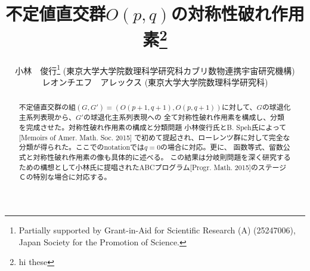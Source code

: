 \documentclass[12pt]{article} %
\theoremstyle{definition}
\theoremstyle{exampstyle} \newtheorem{examp}[theorem]{Theorem}
\newcommand{\doubt}[1]{\uwave{#1}}
\begin{document}
\renewcommand{\abstractname}{概要}

\title{不定値直交群$O(p,q)$の対称性破れ作用素\thanks{hi these}}

\author{小林　俊行\thanks{Partially supported by Grant-in-Aid for Scientific
Research (A) (25247006), Japan Society for the Promotion of Science.} (東京大学\;大学院数理科学研究科\doubt{・}カブリ数物連携宇宙研究機構)\\
  レオンチエフ　アレックス (東京大学\;大学院数理科学研究科)}




  \maketitle
\begin{abstract}
	不定値直交群の組$(G, G') =(O(p+1, q+1), O(p,q+1))$に対して、$G$の球退化主系列表現から、$G'$の球退化主系列表現への
	全て対称性破れ作用素を構成し、分類
	を完成させた。対称性破れ作用素の構成と分類問題\doubt{は}
	小林俊行氏とB. Speh氏によって[Memoirs of Amer. Math. Soc. 2015]
	で初めて提起され、ローレンツ群に対して完全な分類が得られた。ここでのnotationでは$q=0$の場合に対応\doubt{する}。更に、
	函数等式、留数公式と対称性破れ作用素の像も具体的に述べる。
	この結果は分岐則問題を深く研究するための構想として小林氏に提唱されたABCプログラム[Progr. Math. 2015]のステージＣの特別な場合に対応する。
\end{abstract}
\end{document}
